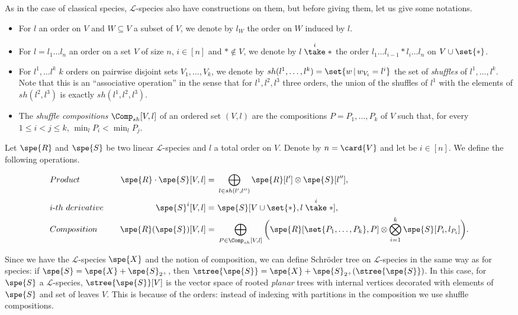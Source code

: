 As in the case of classical species, $\mathscr{L}$-species also have constructions on them, but before giving them, let us give some notations.
\begin{itemize}
    \item For $l$ an order on $V$ and $W\subseteq V$ a subset of $V$, we denote by $l_W$ the order on $W$ induced by $l$.
    \item For $l=l_1\dots l_n$ an order on a set $V$ of size $n$, $i\in[n]$ and $\ast\not\in V$, we denote by $l\stackrel{i}{\take}\ast$ the order 
    $l_1\dots l_{i-1}\ast l_i\dots l_n$ on $V\cup\set{\ast}$.
    \item For $l^1,\dots l^k$ $k$ orders on pairwise disjoint sets $V_1,\dots, V_k$, we denote by $sh(l^1,\dots,l^k)=\set{w\,|\, w_{V_i}=l^i}$ the set of 
    {\em shuffles} of $l^1,\dots, l^k$. Note that this is an ``associative operation'' in the sense that for $l^1,l^2,l^3$ three orders, the union of
    the shuffles of $l^1$ with the elements of $sh(l^2,l^3)$ is exactly $sh(l^1,l^2,l^3)$.
    \item  The {\em shuffle compositions} $\Comp_{sh}[V,l]$ of an ordered set $(V,l)$ are the compositions $P=P_1,\dots,P_k$ of $V$ such that, for every 
    $1\leq i<j\leq k$, $\min_l P_i<\min_l P_j$.
\end{itemize}

Let $\spe{R}$ and $\spe{S}$ be two linear $\mathscr{L}$-species and $l$ a total order on $V$. Denote by $n=\card{V}$ and let be $i\in[n]$. We define the following operations.

\begin{alignat*}{2}
&Product\quad & \spe{R}\cdot\spe{S}[V,l] = & \ \bigoplus_{l\in sh(l',l'')} \spe{R}[l']\otimes\spe{S}[l''], \\
&i\text{-}th\ derivative\quad & \spe{S}^i[V,l] = & \ \spe{S}[V\cup\set{\ast}, l\stackrel{i}{\take}\ast], \\
&Composition\quad & \spe{R}(\spe{S})[V,l] = & \ \bigoplus_{P\in\Comp_{sh}[V,l]} \bigg(\spe{R}[\set{P_1,\dots,P_k},P]\otimes 
\bigotimes_{i=1}^k \spe{S}[P_i, l_{P_i}]\bigg).
\end{alignat*}

Since we have the $\mathscr{L}$-species $\spe{X}$ and the notion of composition, we can define Schröder tree on $\mathscr{L}$-species in the same way as
for species: if $\spe{S} = \spe{X} + \spe{S}_{2^+}$, then $\stree{\spe{S}} = \spe{X} + \spe{S}_{2^+}(\stree{\spe{S}})$. 
In this case, for $\spe{S}$ a $\mathscr{L}$-species, $\stree{\spe{S}}[V]$ is the vector space of rooted {\em planar} trees with internal vertices decorated 
with elements of $\spe{S}$ and set of leaves $V$.
This is because of the orders: instead of indexing with partitions in the composition we use shuffle compositions.

